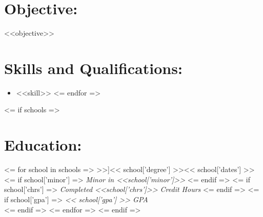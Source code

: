 \documentclass{resume}
\author{ <<author>> }
\begin{document}
\maketitle

\section{Objective:}

\small <<objective>> \normalsize

\section{Skills and Qualifications:}
\small\begin{itemize}
<= for skill in skills =>
    \item <<skill>>
<= endfor =>
\end{itemize}\normalsize

<= if schools =>
    \section{Education:}
    <= for school in schools =>
        \affiliation[<< school['place'] >>]{<< school['degree'] >>}{<< school['dates'] >>}
        <= if school['minor'] =>
            \textit{Minor in <<school['minor']>>}
        <= endif =>
        <= if school['chrs'] =>
            \textit{Completed <<school['chrs']>> Credit Hours}
        <= endif =>
        <= if school['gpa'] =>
            \emph{ << school['gpa'] >> GPA}\\
        <= endif =>
    <= endfor =>
<= endif =>
\end{document}

